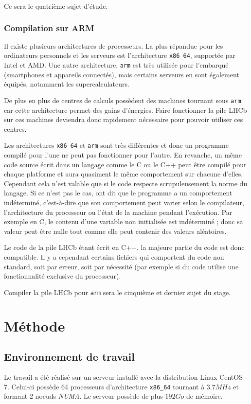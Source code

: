 \documentclass[a4paper,11pt]{report}
\begin{document}
\bigskip
Ce sera le quatrième sujet d'étude.

\subsection{Compilation sur ARM}\label{section:arm}
Il existe plusieurs architectures de processeurs.
La plus répandue pour les ordinateurs personnels et les serveurs est l'architecture \verb'x86_64', supportée par Intel et AMD.
Une autre architecture, \verb'arm' est très utilisée pour l'embarqué (smartphones et appareils connectés), mais certains serveurs en sont également équipés, notamment les supercalculateurs.

De plus en plus de centres de calculs possèdent des machines tournant sous \verb'arm' car cette architecture permet des gains d'énergies.
Faire fonctionner la pile LHCb sur ces machines deviendra donc rapidement nécessaire pour pouvoir utiliser ces centres.

Les architectures \verb'x86_64' et \verb'arm' sont très différentes et donc un programme compilé pour l'une ne peut pas fonctionner pour l'autre.
En revanche, un même code source écrit dans un langage comme le C ou le C++ peut être compilé pour chaque platforme et aura quasiment le même comportement sur chacune d'elles.
Cependant cela n'est valable que si le code respecte scrupuleusement la norme du langage.
Si ce n'est pas le cas, ont dit que le programme a un comportement indéterminé, c'est-à-dire que son comportement peut varier selon le compilateur, l'architecture du processeur ou l'état de la machine pendant l'exécution.
Par exemple en C, le contenu d'une variable non initialisée est indéterminé ; donc sa valeur peut être nulle tout comme elle peut contenir des valeurs aléatoires.

Le code de la pile LHCb étant écrit en C++, la majeure partie du code est donc compatible.
Il y a cependant certains fichiers qui comportent du code non standard, soit par erreur, soit par nécessité (par exemple si du code utilise une fonctionnalité exclusive du processeur).

\bigskip
Compiler la pile LHCb pour \verb'arm' sera le cinquième et dernier sujet du stage.


\chapter{Méthode}
\section{Environnement de travail}
Le travail a été réalisé sur un serveur installé avec la distribution Linux CentOS 7.
Celui-ci possède 64 processeurs d'architecture \verb'x86_64' tournant à $3.7 MHz$ et formant 2 noeuds \emph{NUMA}.
Le serveur possède de plus $192 Go$ de mémoire.
\end{document}
